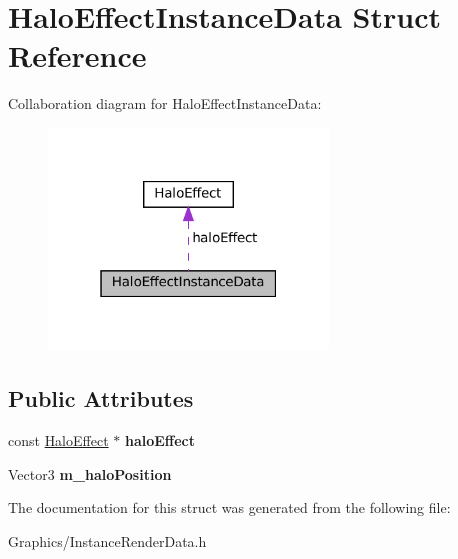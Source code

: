 \hypertarget{structHaloEffectInstanceData}{}\section{Halo\+Effect\+Instance\+Data Struct Reference}
\label{structHaloEffectInstanceData}


Collaboration diagram for Halo\+Effect\+Instance\+Data\+:\nopagebreak
\begin{figure}[H]
\begin{center}
\leavevmode
\includegraphics[width=211pt]{structHaloEffectInstanceData__coll__graph}
\end{center}
\end{figure}
\subsection*{Public Attributes}
\begin{DoxyCompactItemize}
\item 
\mbox{\label{structHaloEffectInstanceData_a295122f90b9b3fbca4e59e4bd75282bc}} 
const \hyperlink{classHaloEffect}{Halo\+Effect} $\ast$ {\bfseries halo\+Effect}
\item 
\mbox{\label{structHaloEffectInstanceData_a946f37f81ada32117d6b71920b786fd9}} 
Vector3 {\bfseries m\+\_\+halo\+Position}
\end{DoxyCompactItemize}


The documentation for this struct was generated from the following file\+:\begin{DoxyCompactItemize}
\item 
Graphics/Instance\+Render\+Data.\+h\end{DoxyCompactItemize}
